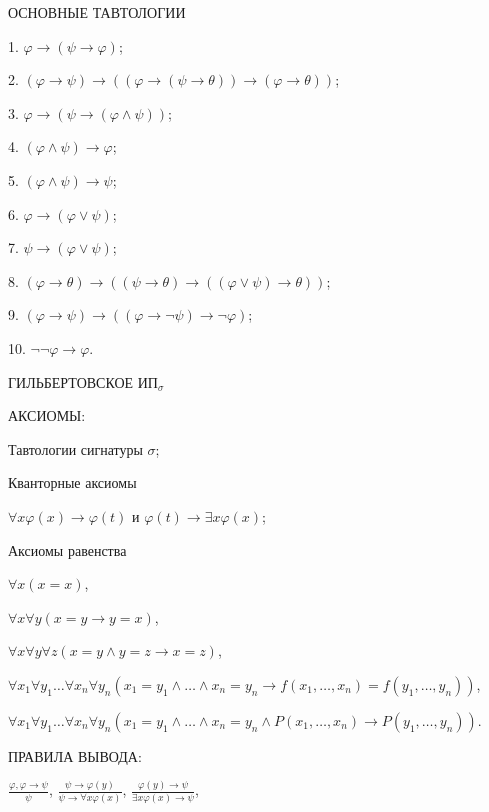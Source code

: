 \documentclass[a4paper,11pt]{article}
\begin{document}
ОСНОВНЫЕ ТАВТОЛОГИИ
\medskip

1. $\varphi\rightarrow(\psi\rightarrow\varphi)$; 

2. $(\varphi\rightarrow\psi) \rightarrow ((\varphi\rightarrow (\psi
\rightarrow \theta))\rightarrow
(\varphi \rightarrow\theta))$;
\medskip

3. $\varphi \rightarrow (\psi\rightarrow (\varphi \land \psi))$;

4. $(\varphi
\land \psi)\rightarrow \varphi$;

5. $(\varphi \land \psi) \rightarrow\psi$; 
\medskip

6. $\varphi
\rightarrow
(\varphi \lor \psi)$;

7. $\psi \rightarrow (\varphi \lor \psi)$;

8. $(\varphi
\rightarrow \theta) \rightarrow ((\psi \rightarrow \theta)
\rightarrow ((\varphi \lor \psi) \rightarrow
\theta))$;
\medskip

9. $(\varphi \rightarrow \psi) \rightarrow ((\varphi \rightarrow
\neg\psi) \rightarrow \neg\varphi)$; 

10. $\neg\neg\varphi\rightarrow \varphi$.
\pagebreak


ГИЛЬБЕРТОВСКОЕ  ИП$_\sigma$

АКСИОМЫ: 

Тавтологии сигнатуры $\sigma$; 
\medskip

Кванторные аксиомы 

$\forall x \varphi(x)\rightarrow
\varphi(t)$ и $\varphi(t)\rightarrow \exists x \varphi(x)$;
\medskip

Аксиомы равенства 

$\forall x (x = x)$, 

$\forall x \forall y(x = y
\rightarrow y = x)$, 

$\forall x \forall y\forall z (x = y \land y
= z \rightarrow x = z)$, 
\medskip

$\forall x_1 \forall y_1\ldots \forall
x_n \forall y_n (x_1 = y_1 \land \ldots \land x_n = y_n
\rightarrow f(x_1,\ldots,x_n) = f(y_1,\ldots, y_n))$, 
\medskip

$\forall x_1
\forall y_1\ldots\forall x_n \forall y_n (x_1 = y_1 \land \ldots
\land x_n = y_n \land P(x_1,\ldots, x_n) \rightarrow
P(y_1,\ldots, y_n))$.
\medskip

ПРАВИЛА ВЫВОДА:
\medskip

$\frac{\varphi,\varphi\rightarrow\psi}{\psi}$,\;\;\;
$\frac{\psi\rightarrow \varphi(y)}{\psi\rightarrow\forall
x\varphi(x)}$, \;\;\;
$\frac{\varphi(y)\rightarrow\psi}{\exists
x\varphi(x)\rightarrow\psi}$, 
\medskip
\end{document}
